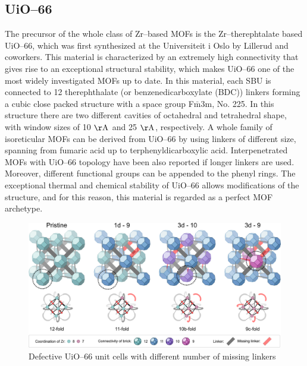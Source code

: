 \subsection*{UiO--66}
The precursor of the whole class of Zr--based MOFs is the Zr--therephtalate based UiO--66, which was first synthesized at the Universiteit i Oslo by Lillerud and coworkers\cite{cavka2008new}. This material is characterized by an extremely high connectivity that gives rise to an exceptional structural stability, which makes UiO--66 one of the most widely investigated MOFs up to date. In this material, each  SBU is connected to 12 therephthalate (or benzenedicarboxylate (BDC)) linkers forming a cubic close packed structure with a space group F$\bar{\mathrm{m}}$3m, No. 225. In this structure there are two different cavities of octahedral and tetrahedral shape, with window sizes of 10 $\mathrm{\AA}$ and 25 $\mathrm{\AA}$, respectively. A whole family of isoreticular MOFs can be derived from UiO--66 by using linkers of different size, spanning from fumaric acid\cite{wissmann2012modulated} up to terphenyldicarboxylic acid\cite{schaate2011modulated}. Interpenetrated MOFs with UiO--66 topology have been also reported if longer linkers are used\cite{schaate2011porous}. Moreover, different functional groups can be appended to the phenyl rings.
The exceptional thermal and chemical stability of UiO--66 allows modifications of the structure, and for this reason, this material is regarded as a perfect MOF archetype.

\begin{figure}[!htbp]
	\centering
 	\includegraphics[width=1.0\textwidth]{defectivebricks}
	\caption{Defective UiO--66 unit cells with different number of missing linkers}
	\label{fig:defectivebricks}
\end{figure}

